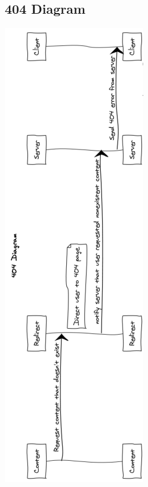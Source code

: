 \documentclass[12pt]{article}
\begin{document}
\subsection{404 Diagram}
\includegraphics[width = .6\textwidth]{dia404.PNG}
\end{document}
